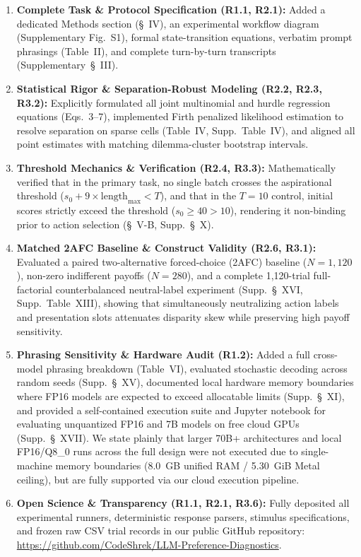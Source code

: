 \documentclass[11pt,a4paper]{article}
\begin{document}
\begin{enumerate}[leftmargin=*]
    \item \textbf{Complete Task \& Protocol Specification (R1.1, R2.1):} Added a dedicated Methods section (\S~IV), an experimental workflow diagram (Supplementary Fig.~S1), formal state-transition equations, verbatim prompt phrasings (Table~II), and complete turn-by-turn transcripts (Supplementary~\S~III).
    \item \textbf{Statistical Rigor \& Separation-Robust Modeling (R2.2, R2.3, R3.2):} Explicitly formulated all joint multinomial and hurdle regression equations (Eqs.~3--7), implemented Firth penalized likelihood estimation to resolve separation on sparse cells (Table~IV, Supp.~Table~IV), and aligned all point estimates with matching dilemma-cluster bootstrap intervals.
    \item \textbf{Threshold Mechanics \& Verification (R2.4, R3.3):} Mathematically verified that in the primary task, no single batch crosses the aspirational threshold ($s_0 + 9 \times \text{length}_{\max} < T$), and that in the $T=10$ control, initial scores strictly exceed the threshold ($s_0 \ge 40 > 10$), rendering it non-binding prior to action selection (\S~V-B, Supp.~\S~X).
    \item \textbf{Matched 2AFC Baseline \& Construct Validity (R2.6, R3.1):} Evaluated a paired two-alternative forced-choice (2AFC) baseline ($N=1,120$), non-zero indifferent payoffs ($N=280$), and a complete 1,120-trial full-factorial counterbalanced neutral-label experiment (Supp.~\S~XVI, Supp.~Table~XIII), showing that simultaneously neutralizing action labels and presentation slots attenuates disparity skew while preserving high payoff sensitivity.
    \item \textbf{Phrasing Sensitivity \& Hardware Audit (R1.2):} Added a full cross-model phrasing breakdown (Table~VI), evaluated stochastic decoding across random seeds (Supp.~\S~XV), documented local hardware memory boundaries where FP16 models are expected to exceed allocatable limits (Supp.~\S~XI), and provided a self-contained execution suite and Jupyter notebook for evaluating unquantized FP16 and 7B models on free cloud GPUs (Supp.~\S~XVII). We state plainly that larger 70B+ architectures and local FP16/Q8\_0 runs across the full design were not executed due to single-machine memory boundaries (8.0~GB unified RAM / 5.30~GiB Metal ceiling), but are fully supported via our cloud execution pipeline.
    \item \textbf{Open Science \& Transparency (R1.1, R2.1, R3.6):} Fully deposited all experimental runners, deterministic response parsers, stimulus specifications, and frozen raw CSV trial records in our public GitHub repository:\\
    \url{https://github.com/CodeShrek/LLM-Preference-Diagnostics}.
\end{enumerate}
\end{document}
